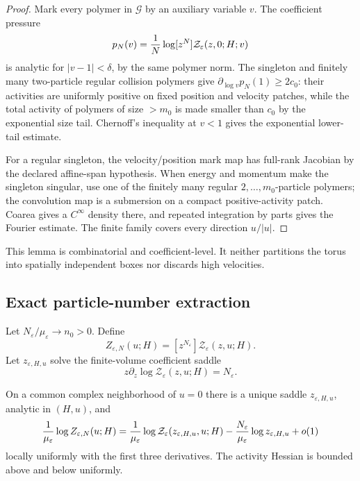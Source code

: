 \begin{proof}
Mark every polymer in \(\mathcal G\) by an auxiliary variable \(v\).  The
coefficient pressure
\[
 p_N(v)={1\over N}\log[z^N]\mathcal Z_\varepsilon(z,0;H;v)
\]
is analytic for \(|v-1|<\delta\), by the same polymer norm.  The singleton
and finitely many two-particle regular collision polymers give
\(\partial_{\log v}p_N(1)\ge2c_0\): their activities are uniformly positive
on fixed position and velocity patches, while the total activity of polymers
of size \(>m_0\) is made smaller than \(c_0\) by the exponential size tail.
Chernoff's inequality at \(v<1\) gives the exponential lower-tail estimate.

For a regular singleton, the velocity/position mark map has full-rank
Jacobian by the declared affine-span hypothesis.  When energy and momentum
make the singleton singular, use one of the finitely many regular
\(2,\ldots,m_0\)-particle polymers; the convolution map is a submersion on a
compact positive-activity patch.  Coarea gives a \(C^\infty\) density there,
and repeated integration by parts gives the Fourier estimate.  The finite
family covers every direction \(u/|u|\).
\end{proof}

This lemma is combinatorial and coefficient-level.  It neither partitions the
torus into spatially independent boxes nor discards high velocities.

\subsection{Exact particle-number extraction}

Let \(N_\varepsilon/\mu_\varepsilon\to n_0>0\).  Define
\[
 Z_{\varepsilon,N}(u;H)
 =[z^{N_\varepsilon}]\mathcal Z_\varepsilon(z,u;H).
\]
Let \(z_{\varepsilon,H,u}\) solve the finite-volume coefficient saddle
\[
 z\partial_z\log\mathcal Z_\varepsilon(z,u;H)=N_\varepsilon .
\]

\begin{theorem}
\label{thm:r14-b1-saddle}
On a common complex neighborhood of \(u=0\) there is a unique saddle
\(z_{\varepsilon,H,u}\), analytic in \((H,u)\), and
\[
 {1\over\mu_\varepsilon}\log Z_{\varepsilon,N}(u;H)
 =
 {1\over\mu_\varepsilon}\log
 \mathcal Z_\varepsilon(z_{\varepsilon,H,u},u;H)
 -{N_\varepsilon\over\mu_\varepsilon}\log z_{\varepsilon,H,u}
 +o(1)
\]
locally uniformly with the first three derivatives.  The activity Hessian is
bounded above and below uniformly.
\end{theorem}

